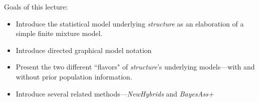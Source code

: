 



\newcommand{\squashfish}{\raisebox{-.4em}{\mbox{\texttt{[image: 
squash\_fish.pdf]}}}
}

\newcommand{\redsquashfish}{\raisebox{-.4em}{\mbox{\texttt{[image: 
redsquash\_fish.pdf]}}}
}

\newcommand{\bbfish}{\raisebox{-.8em}{\mbox{\texttt{[image: 
fish\_bb.pdf]}}}
}
\newcommand{\clearfish}{\raisebox{-.8em}{\mbox{\texttt{[image: 
fish\_clear.pdf]}}}
}
\newcommand{\rrfish}{\raisebox{-.8em}{\mbox{\texttt{[image: 
fish\_rr.pdf]}}}
}
\newcommand{\brfish}{\raisebox{-.8em}{\mbox{\texttt{[image: 
fish\_br.pdf]}}}
}
\newcommand{\rbfish}{\raisebox{-.8em}{\mbox{\texttt{[image: 
fish\_rb.pdf]}}}
}

\newcommand{\bbloc}{\raisebox{-.35em}{\mbox{\texttt{[image: 
loc\_bb.pdf]}}}
}

\newcommand{\brloc}{\raisebox{-.35em}{\mbox{\texttt{[image: 
loc\_br.pdf]}}}
}

\newcommand{\rbloc}{\raisebox{-.35em}{\mbox{\texttt{[image: 
loc\_rb.pdf]}}}
}

\newcommand{\rrloc}{\raisebox{-.35em}{\mbox{\texttt{[image: 
loc\_rr.pdf]}}}
}
\newcommand{\tc}{\textcolor}



Goals of this lecture:
\begin{itemize}
\item Introduce the statistical model underlying {\sl structure} as an elaboration of a simple finite mixture model. 
\item Introduce directed graphical model notation
\item Present the two different ``flavors" of {\sl structure}'s underlying models---with and without prior population information.
\item Introduce several related methods---{\sl NewHybrids} and {\sl BayesAss+}
\end{itemize}


